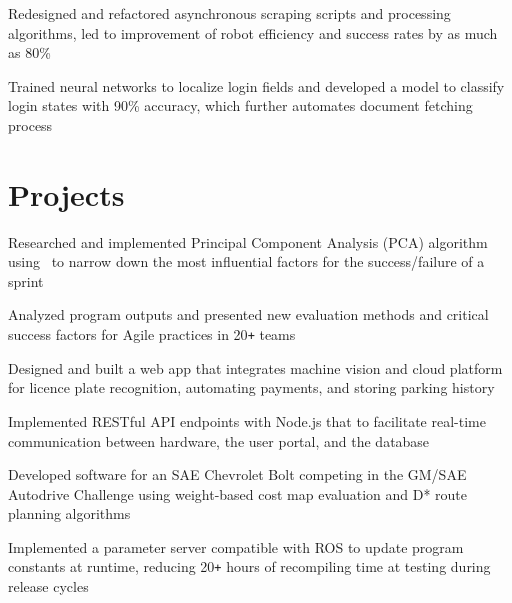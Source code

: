 \documentclass{mxresume}
\begin{document}
\begin{minipage}[t]{0.72\textwidth}
\begin{resumebody}
\begin{large}
%
%
\begin{tightemize}{5mm}
\item Redesigned and refactored asynchronous scraping scripts and processing algorithms, led to improvement of robot efficiency and success rates by as much as 80\textsc{\%}
\item Trained neural networks to localize login fields and developed a model to classify login states with 90\textsc{\%} accuracy, which further automates document fetching process
\end{tightemize}
%
%
\section*{Projects}
%
\begin{tightemize}{5mm}
\item Researched and implemented Principal Component Analysis (PCA) algorithm using \Csharp\ to narrow down the most influential factors for the success/failure of a sprint
\item Analyzed program outputs and presented new evaluation methods and critical success factors for Agile practices in 20\texttt{+} teams
\end{tightemize}
%
%
\begin{tightemize}{5mm}
\item Designed and built a web app that integrates machine vision and cloud platform for licence plate recognition, automating payments, and storing parking history
\item Implemented RESTful API endpoints with Node.js that to facilitate real-time communication between hardware, the user portal, and the database
\end{tightemize}
%
%
\begin{tightemize}{5mm}
\item Developed software for an SAE Chevrolet Bolt competing in the GM/SAE Autodrive Challenge using weight-based cost map evaluation and D* route planning algorithms
\item Implemented a parameter server compatible with ROS to update program constants at runtime, reducing 20\texttt{+} hours of recompiling time at testing during release cycles
\end{tightemize}
\end{large}
\end{resumebody}
\end{minipage}
\hfill
\end{document}
